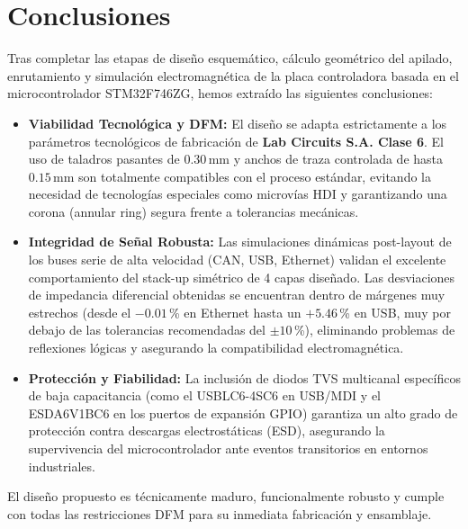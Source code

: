 \documentclass[12pt,a4paper]{article}
\begin{document}
\section{Conclusiones}

Tras completar las etapas de diseño esquemático, cálculo geométrico del apilado, enrutamiento y simulación electromagnética de la placa controladora basada en el microcontrolador STM32F746ZG, hemos extraído las siguientes conclusiones:

\begin{itemize}
    \item \textbf{Viabilidad Tecnológica y DFM:} El diseño se adapta estrictamente a los parámetros tecnológicos de fabricación de \textbf{Lab Circuits S.A. Clase 6}. El uso de taladros pasantes de $0.30\,\text{mm}$ y anchos de traza controlada de hasta $0.15\,\text{mm}$ son totalmente compatibles con el proceso estándar, evitando la necesidad de tecnologías especiales como microvías HDI y garantizando una corona (annular ring) segura frente a tolerancias mecánicas.
    \item \textbf{Integridad de Señal Robusta:} Las simulaciones dinámicas post-layout de los buses serie de alta velocidad (CAN, USB, Ethernet) validan el excelente comportamiento del stack-up simétrico de 4 capas diseñado. Las desviaciones de impedancia diferencial obtenidas se encuentran dentro de márgenes muy estrechos (desde el $-0.01$\,\% en Ethernet hasta un $+5.46$\,\% en USB, muy por debajo de las tolerancias recomendadas del $\pm10$\,\%), eliminando problemas de reflexiones lógicas y asegurando la compatibilidad electromagnética.
    \item \textbf{Protección y Fiabilidad:} La inclusión de diodos TVS multicanal específicos de baja capacitancia (como el USBLC6-4SC6 en USB/MDI y el ESDA6V1BC6 en los puertos de expansión GPIO) garantiza un alto grado de protección contra descargas electrostáticas (ESD), asegurando la supervivencia del microcontrolador ante eventos transitorios en entornos industriales.
\end{itemize}

El diseño propuesto es técnicamente maduro, funcionalmente robusto y cumple con todas las restricciones DFM para su inmediata fabricación y ensamblaje.
\end{document}

